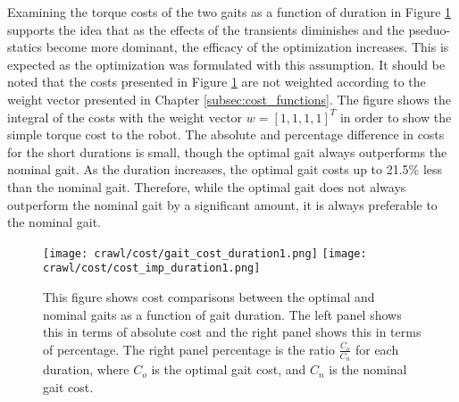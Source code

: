 Examining the torque costs of the two gaits as a function of duration
in Figure \ref{fig:cost_duration1} supports
the idea that as the effects of the transients diminishes and the pseduo-statics
become more dominant, the efficacy of the optimization increases.
This is expected as the optimization was formulated with this assumption. 
It should be noted that the costs presented in Figure \ref{fig:cost_duration1}
are not weighted according to the weight vector presented in Chapter \ref{subsec:cost_functions}.
The figure shows the integral of the costs with the weight vector $w = [1, 1, 1, 1]^T$
in order to show the simple torque cost to the robot. 
The absolute and percentage difference in costs for the short durations is small,
though the optimal gait always outperforms the nominal gait.
As the duration increases, the optimal gait costs up to 21.5\% less than the
nominal gait. Therefore, while the optimal gait does not always outperform the
nominal gait by a significant amount, it is always preferable to the nominal gait.

\begin{figure}
  \texttt{[image: crawl/cost/gait\_cost\_duration1.png]}
  \texttt{[image: crawl/cost/cost\_imp\_duration1.png]}
  \caption{This figure shows cost comparisons between the optimal and
           nominal gaits as a function of gait duration. The left panel shows
           this in terms of absolute cost and the right panel shows this in 
           terms of percentage. The right panel percentage is the ratio $\frac{C_o}{C_n}$
           for each duration, where $C_o$ is the optimal gait cost, and $C_n$ is the nominal gait cost.}
  \label{fig:cost_duration1}
\end{figure}


